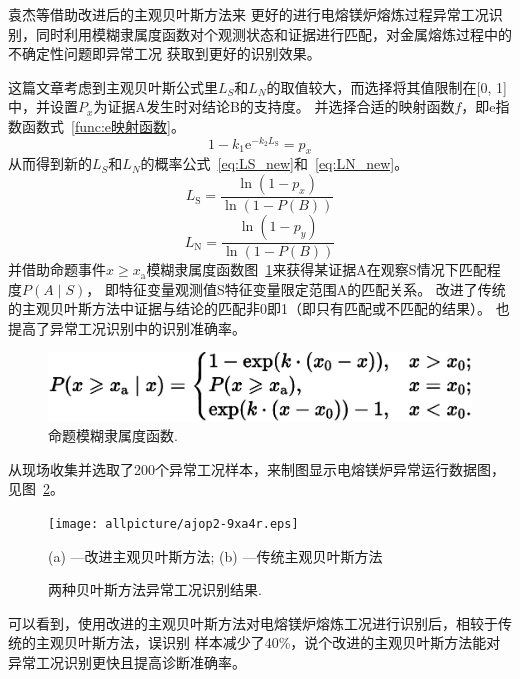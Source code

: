 \documentclass[12pt,a4paper,UTF8]{ctexart}
\begin{document}
袁杰等\cite{YuanJiYuGaiJinZhuGuanBeiYeSiFangFaShiBieDianRongMeiLuYiChangGongKuang2021}借助改进后的主观贝叶斯方法来
更好的进行电熔镁炉熔炼过程异常工况识别，同时利用模糊隶属度函数对个观测状态和证据进行匹配，对金属熔炼过程中的不确定性问题即异常工况
获取到更好的识别效果。

这篇文章考虑到主观贝叶斯公式里$ L_S $和$ L_N $的取值较大，而选择将其值限制在[0, 1]中，并设置$ P_x $为证据A发生时对结论B的支持度。
并选择合适的映射函数$ f $，即e指数函数式~\ref{func:e映射函数}。
\begin{equation}
    \label{func:e映射函数}
    1-k_1 \mathrm{e}^{-k_2 L_{\mathrm{S}}}=p_x
\end{equation}
从而得到新的$ L_S $和$ L_N $的概率公式~\ref{eq:LS_new}和~\ref{eq:LN_new}。
\begin{equation}
    \label{eq:LS_new}
    L_{\mathrm{S}}=\frac{\ln \left(1-p_x\right)}{\ln (1-P(B))}
\end{equation}
\begin{equation}
    \label{eq:LN_new}
    L_{\mathrm{N}}=\frac{\ln \left(1-p_y\right)}{\ln (1-P(B))}
\end{equation}
并借助命题事件$ x \geq x_{\mathrm{a}} $模糊隶属度函数图~\ref{fig:模糊隶属度函数}来获得某证据A在观察S情况下匹配程度$ P(A \mid S) $，
即特征变量观测值S特征变量限定范围A的匹配关系。
改进了传统的主观贝叶斯方法中证据与结论的匹配非0即1（即只有匹配或不匹配的结果）。
也提高了异常工况识别中的识别准确率。
\begin{figure}[htbp]
    \centering
    \includegraphics[width=12cm]{allpicture/a8ls3-uktor.eps}
    \caption{命题模糊隶属度函数.}
    \label{fig:模糊隶属度函数}
\end{figure}

从现场收集并选取了200个异常工况样本，来制图显示电熔镁炉异常运行数据图，见图~\ref{fig:贝叶斯方法结果}。
\begin{figure}[htbp]
    \centering
    \texttt{[image: allpicture/ajop2-9xa4r.eps]}
    \caption{两种贝叶斯方法异常工况识别结果.}
    {(a) —改进主观贝叶斯方法; (b) —传统主观贝叶斯方法}
    \label{fig:贝叶斯方法结果}
\end{figure}
可以看到，使用改进的主观贝叶斯方法对电熔镁炉熔炼工况进行识别后，相较于传统的主观贝叶斯方法，误识别
样本减少了40\%，说个改进的主观贝叶斯方法能对异常工况识别更快且提高诊断准确率\cite{YuanJiYuGaiJinZhuGuanBeiYeSiFangFaShiBieDianRongMeiLuYiChangGongKuang2021}。
\end{document}
